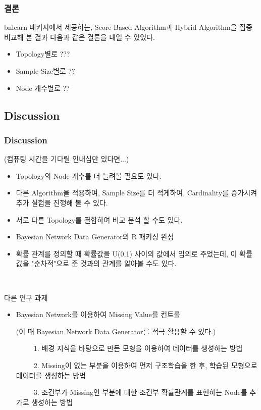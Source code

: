 \documentclass{beamer}
\begin{document}
\begin{frame}
\frametitle{결론}
{\scriptsize{}
	bnlearn 패키지에서 제공하는, Score-Based Algorithm과 Hybrid Algorithm을 집중 비교해 본 결과 다음과 같은 결론을 내일 수 있었다.

	\begin{itemize}	
		\item Topology별로	???
		\item Sample Size별로	??
		\item Node 개수별로	??
	\end{itemize}	
}
\end{frame}

\subsection{Discussion}
\begin{frame}
\frametitle{Discussion}
{\scriptsize{}

	(컴퓨팅 시간을 기다릴 인내심만 있다면...)
	
	\begin{itemize}
		\item Topology의 Node 개수를 더 늘려볼 필요도 있다.
	
		\item 다른 Algorithm을 적용하여, Sample Size를 더 적게하여, Cardinality를 증가시켜 추가 실험을 진행해 볼 수 있다.

		\item 서로 다른 Topology를 결합하여 비교 분석 할 수도 있다.

		\item Bayesian Network Data Generator의 R 패키징 완성
		
		\item 확률 관계를 정의할 때 확률값을 U(0,1) 사이의 값에서 임의로 주었는데, 이 확률값을 "순차적"으로 준 것과의 관계를 알아볼 수도 있다.
	\end{itemize}
	
	{}\	
	
	다른 연구 과제
	
	\begin{itemize}	
		\item  Bayesian Network를 이용하여 Missing Value를 컨트롤
		
		(이 때 Bayesian Network Data Generator를 적극 활용할 수 있다.)
		
			~~~~~1. 배경 지식을 바탕으로 만든 모형을 이용하여 데이터를 생성하는 방법
			
			~~~~~2. Missing이 없는 부분을 이용하여 먼저 구조학습을 한 후, 학습된 모형으로 데이터를 생성하는 방법
			
			~~~~~3. 조건부가 Missing인 부분에 대한 조건부 확률관계를 표현하는 Node를 추가로 생성하는 방법			
	\end{itemize}
}
\end{frame}
\end{document}

